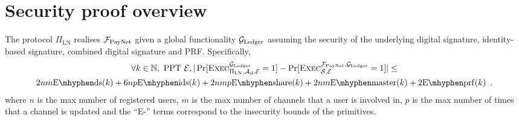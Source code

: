 \section{Security proof overview}
\label{sec:ov-security-proof}
  \begin{theorem}
The protocol $\Pi_{\mathrm{LN}}$ realises $\mathcal{F}_{\mathrm{PayNet}}$
given a global functionality $\mathcal{G}_{\mathrm{Ledger}}$
assuming the security of the underlying digital signature, identity-based signature, 
combined digital signature and PRF. Specifically, 
    \label{theorem:simulation}
    \begin{gather*}
      \forall k \in \mathbb{N}, \text{ PPT } \environment, 
      |\Pr[\textsc{Exec}^{\ledger}_{\Pi_{\mathrm{LN}}, \adversary_{\mathrm{d}},
      \environment} = 1] - \Pr[\textsc{Exec}^{\fpaynet, \ledger}_{\simulator,
      \environment} = 1]| \leq \\
      2nm  \mathrm{E \mhyphen ds}(k)  + 6np  \mathrm{E \mhyphen ids}(k) +
      2nmp  \mathrm{E \mhyphen share}(k) + 2nm \mathrm{E \mhyphen master}(k)+  2 \mathrm{E \mhyphen
      prf}(k)  \enspace.
    \end{gather*}
    where $n$ is the max number of registered users, 
    $m$ is the max number of channels that a user is involved in,
    $p$ is the max number of times that a channel is updated
    and the ``E-'' terms correspond to the insecurity bounds of the
    primitives. 
  \end{theorem}

